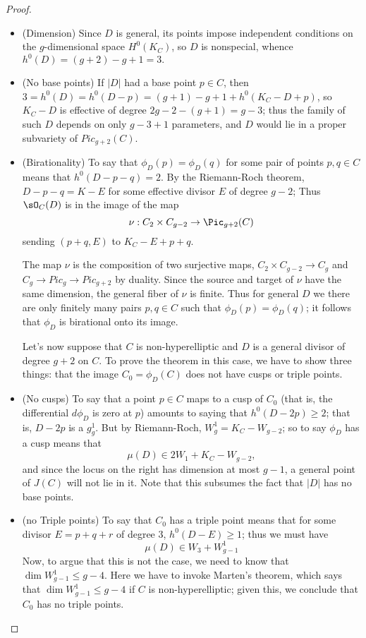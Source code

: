 \begin{proof}
\begin{itemize}
\item (Dimension) Since $D$ is general, its points impose independent conditions on the $g$-dimensional space $H^0(K_C)$,
so $D$ is nonspecial, whence $h^0(D) = (g+2)-g+1 = 3.$

\item (No base points) If $|D|$ had a base point $p\in C$, then $3=h^0(D) = h^0(D-p) = (g+1)-g+1+h^0(K_C-D+p)$,
so $K_C-D$ is effective of degree $2g-2-(g+1) =g-3$; thus the family of such $D$ depends on only $g-3+1$ parameters,
and $D$ would lie in a proper subvariety of $Pic_{g+2}(C).$

\item (Birationality)
 To say that $\phi_D(p) = \phi_D(q)$ for some pair of points $p, q \in C$   means that $h^0(D-p-q) = 2$. By the Riemann-Roch
 theorem, $D-p-q = K-E$ for some effective divisor $E$ of degree $g-2$; Thus $\sO_C(D)$ is in the image of the map
$$
\nu : C_2 \times C_{g-2} \to \Pic_{g+2}(C)
$$
sending $(p+q, E)$ to $K_C - E + p + q$. 

The map $\nu$ is 
the composition of two surjective maps, $C_2 \times C_{g-2} \to C_g$ and $C_g\to Pic_g \to Pic_{g+2}$ by duality. Since the source and target of $\nu$ have the same dimension, the general fiber of $\nu$ is finite. Thus for general $D$ we  there are only finitely many pairs $p, q \in C$ such that $\phi_D(p) = \phi_D(q)$; it follows that $\phi_D$ is birational onto its image.

Let's now suppose that $C$ is non-hyperelliptic and $D$ is a general divisor of degree $g+2$ on $C$. To prove the theorem in this case, we have to show  three things: that the image $C_0 = \phi_D(C)$ does not have cusps or triple points.

\item (No cusps) To say that a point $p \in C$ maps to a cusp of $C_0$ (that is, the differential $d\phi_D$ is zero at $p$) amounts to saying that $h^0(D-2p) \geq 2$; that is, $D-2p$ is a $g^1_g$. But by Riemann-Roch, $W^1_g = K_C - W_{g-2}$; so to say $\phi_D$ has a cusp means that
$$
\mu(D) \in 2W_1 + K_C - W_{g-2},
$$
and since the locus on the right has dimension at most $g-1$, a general point of $J(C)$ will not lie in it. Note that this subsumes the fact that $|D|$ has no base points.

\item (no Triple points) To say that $C_0$ has a triple point means that for some divisor $E = p+q+r$ of degree 3, $h^0(D-E) \geq 1$; thus we must have 
$$
\mu(D) \in W_3 + W^1_{g-1}
$$
Now, to argue that this is not the case, we need to know that $\dim W^1_{g-1} \leq g-4$. Here we have to invoke Marten's theorem, which says that $\dim W^1_{g-1} \leq g-4$ if $C$ is non-hyperelliptic; given this, we conclude that $C_0$ has no triple points.


\end{itemize}
\end{proof}

